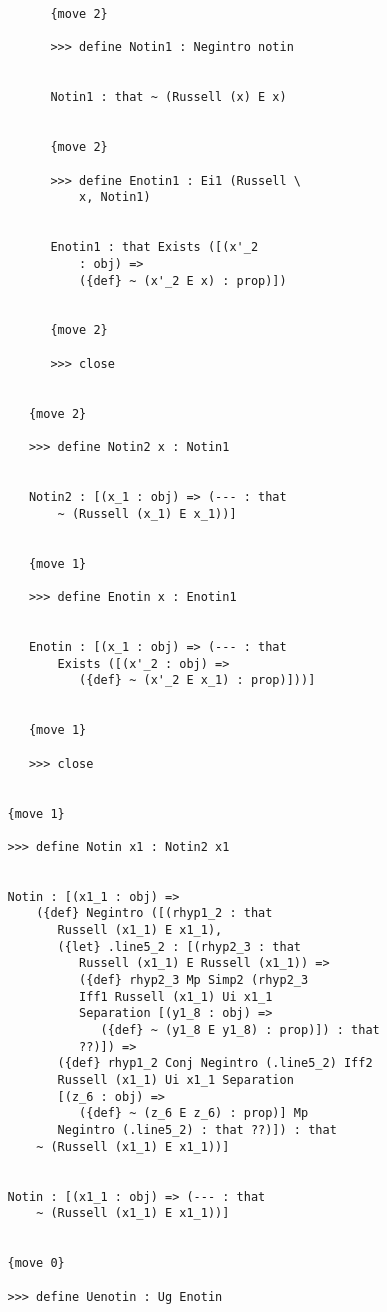 \documentclass[12pt]{article}
\begin{document}
\begin{verbatim}
         {move 2}

         >>> define Notin1 : Negintro notin


         Notin1 : that ~ (Russell (x) E x)


         {move 2}

         >>> define Enotin1 : Ei1 (Russell \
             x, Notin1)


         Enotin1 : that Exists ([(x'_2 
             : obj) => 
             ({def} ~ (x'_2 E x) : prop)])


         {move 2}

         >>> close


      {move 2}

      >>> define Notin2 x : Notin1


      Notin2 : [(x_1 : obj) => (--- : that 
          ~ (Russell (x_1) E x_1))]


      {move 1}

      >>> define Enotin x : Enotin1


      Enotin : [(x_1 : obj) => (--- : that 
          Exists ([(x'_2 : obj) => 
             ({def} ~ (x'_2 E x_1) : prop)]))]


      {move 1}

      >>> close


   {move 1}

   >>> define Notin x1 : Notin2 x1


   Notin : [(x1_1 : obj) => 
       ({def} Negintro ([(rhyp1_2 : that 
          Russell (x1_1) E x1_1), 
          ({let} .line5_2 : [(rhyp2_3 : that 
             Russell (x1_1) E Russell (x1_1)) => 
             ({def} rhyp2_3 Mp Simp2 (rhyp2_3 
             Iff1 Russell (x1_1) Ui x1_1 
             Separation [(y1_8 : obj) => 
                ({def} ~ (y1_8 E y1_8) : prop)]) : that 
             ??)]) => 
          ({def} rhyp1_2 Conj Negintro (.line5_2) Iff2 
          Russell (x1_1) Ui x1_1 Separation 
          [(z_6 : obj) => 
             ({def} ~ (z_6 E z_6) : prop)] Mp 
          Negintro (.line5_2) : that ??)]) : that 
       ~ (Russell (x1_1) E x1_1))]


   Notin : [(x1_1 : obj) => (--- : that 
       ~ (Russell (x1_1) E x1_1))]


   {move 0}

   >>> define Uenotin : Ug Enotin



\end{verbatim}
\end{document}
